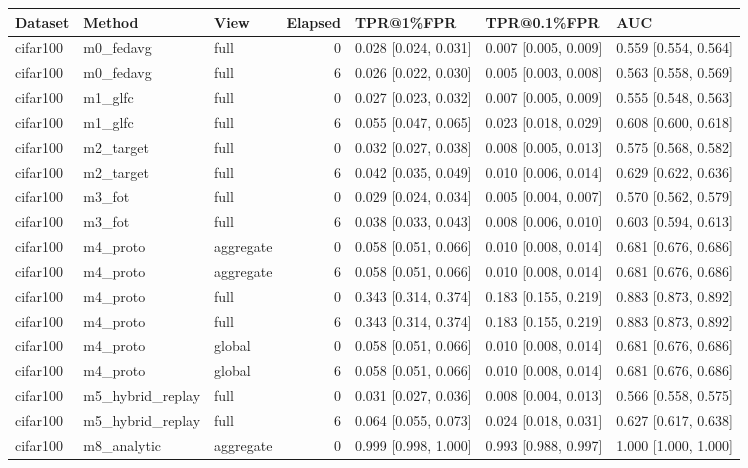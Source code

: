 \begin{tabular}{lllrlll}
\toprule
Dataset & Method & View & Elapsed & TPR@1\%FPR & TPR@0.1\%FPR & AUC \\
\midrule
cifar100 & m0\_fedavg & full & 0 & 0.028 [0.024, 0.031] & 0.007 [0.005, 0.009] & 0.559 [0.554, 0.564] \\
cifar100 & m0\_fedavg & full & 6 & 0.026 [0.022, 0.030] & 0.005 [0.003, 0.008] & 0.563 [0.558, 0.569] \\
cifar100 & m1\_glfc & full & 0 & 0.027 [0.023, 0.032] & 0.007 [0.005, 0.009] & 0.555 [0.548, 0.563] \\
cifar100 & m1\_glfc & full & 6 & 0.055 [0.047, 0.065] & 0.023 [0.018, 0.029] & 0.608 [0.600, 0.618] \\
cifar100 & m2\_target & full & 0 & 0.032 [0.027, 0.038] & 0.008 [0.005, 0.013] & 0.575 [0.568, 0.582] \\
cifar100 & m2\_target & full & 6 & 0.042 [0.035, 0.049] & 0.010 [0.006, 0.014] & 0.629 [0.622, 0.636] \\
cifar100 & m3\_fot & full & 0 & 0.029 [0.024, 0.034] & 0.005 [0.004, 0.007] & 0.570 [0.562, 0.579] \\
cifar100 & m3\_fot & full & 6 & 0.038 [0.033, 0.043] & 0.008 [0.006, 0.010] & 0.603 [0.594, 0.613] \\
cifar100 & m4\_proto & aggregate & 0 & 0.058 [0.051, 0.066] & 0.010 [0.008, 0.014] & 0.681 [0.676, 0.686] \\
cifar100 & m4\_proto & aggregate & 6 & 0.058 [0.051, 0.066] & 0.010 [0.008, 0.014] & 0.681 [0.676, 0.686] \\
cifar100 & m4\_proto & full & 0 & 0.343 [0.314, 0.374] & 0.183 [0.155, 0.219] & 0.883 [0.873, 0.892] \\
cifar100 & m4\_proto & full & 6 & 0.343 [0.314, 0.374] & 0.183 [0.155, 0.219] & 0.883 [0.873, 0.892] \\
cifar100 & m4\_proto & global & 0 & 0.058 [0.051, 0.066] & 0.010 [0.008, 0.014] & 0.681 [0.676, 0.686] \\
cifar100 & m4\_proto & global & 6 & 0.058 [0.051, 0.066] & 0.010 [0.008, 0.014] & 0.681 [0.676, 0.686] \\
cifar100 & m5\_hybrid\_replay & full & 0 & 0.031 [0.027, 0.036] & 0.008 [0.004, 0.013] & 0.566 [0.558, 0.575] \\
cifar100 & m5\_hybrid\_replay & full & 6 & 0.064 [0.055, 0.073] & 0.024 [0.018, 0.031] & 0.627 [0.617, 0.638] \\
cifar100 & m8\_analytic & aggregate & 0 & 0.999 [0.998, 1.000] & 0.993 [0.988, 0.997] & 1.000 [1.000, 1.000] \\

\end{tabular}
